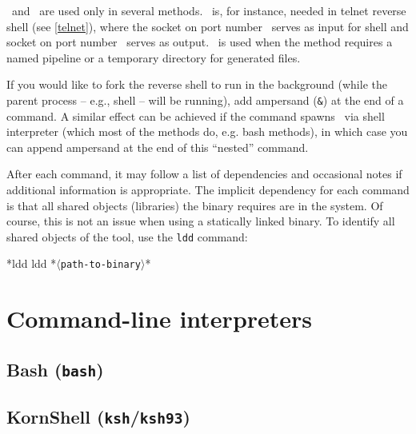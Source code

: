 \portt\ and \tmp\ are used only in several methods. \portt\ is, for instance, needed in telnet reverse shell (see \ref{telnet}), where the socket on port number \port\ serves as input for shell and socket on port number \portt\ serves as output. \tmp\ is used when the method requires a named pipeline or a temporary directory for generated files.

If you would like to fork the reverse shell to run in the background (while the parent process -- e.g., shell -- will be running), add ampersand (\texttt{\&}) at the end of a command. A similar effect can be achieved if the command spawns \shell\ via shell interpreter (which most of the methods do, e.g. bash methods), in which case you can append ampersand at the end of this ``nested'' command.

After each command, it may follow a list of dependencies and occasional notes if additional information is appropriate. The implicit dependency for each command is that all shared objects (libraries) the binary requires are in the system. Of course, this is not an issue when using a statically linked binary. To identify all shared objects of the tool, use the \texttt{ldd} command:
\begin{cmdline}{*}{ldd}{}
ldd *\textcolor{placeholder}{\texttt{$\langle$path-to-binary$\rangle$}}*
\end{cmdline}

\section{Command-line interpreters}

\subsection{Bash (\texttt{bash})}






\subsection{KornShell (\texttt{ksh}/\texttt{ksh93})}


